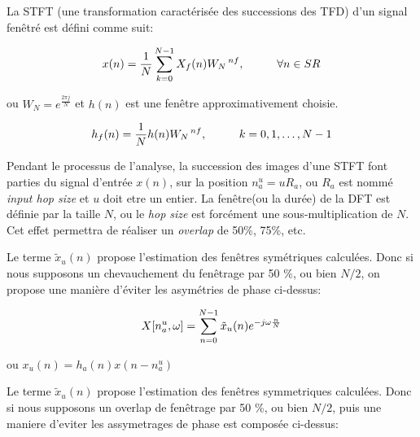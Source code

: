 \vspace{0.4cm}

La STFT (une transformation caractérisée des successions des TFD) d'un signal fenêtré est défini comme suit:

\begin{equation}
    x(n) = \frac{1}{N}\sum_{ k = 0 }^{ N-1 } X_f (n)W_N \hspace{0.05cm}^{ nf}, \hspace{1cm} \forall n \in SR 
\end{equation}

ou \hspace{0.1cm} $ W_N = e ^ {\frac{2\pi j}{N}} $ \hspace{0.1cm} et $ h(n) $ est une fenêtre approximativement choisie.

\begin{equation}
    h_f(n) = \frac{1}{N} h(n) W_N \hspace{0.05cm} ^{nf},\hspace{1cm}  k = 0, 1, \dots, N - 1 
\end{equation}

Pendant le processus de l'analyse, la succession des images d'une STFT font parties du signal d'entrée $x(n)$, sur la position $n_a^u = uR_a$, ou $R_a$ est nommé \textit{input hop size} et $u$ doit etre un entier. La fenêtre(ou la durée) de la DFT est définie par la taille $N$, ou le \textit{hop size} est forcément une sous-multiplication de $N$. Cet effet permettra de réaliser un \textit{overlap} de 50\%, 75\%, etc.

Le terme $\tilde{x}_u(n)$ propose l'estimation des fenêtres symétriques calculées. Donc si nous supposons un chevauchement du fenêtrage par 50 \%, ou bien $N/2$, on propose une manière d'éviter les asymétries de phase ci-dessus:  

\begin{equation}
    X[n_a^u, \omega] = \sum_{n=0} ^{N-1} \tilde{x}_u(n) e^{-j \omega \frac{n}{N}} \vspace{0.5cm} 
\end{equation}

\hspace{5cm} ou \hspace{1cm} ${x}_u(n) = h_a(n) x(n-n_a^u)$ 

Le terme $\tilde{x}_u(n)$ propose l'estimation des fenêtres symmetriques calculées. Donc si nous supposons un overlap de fenêtrage par 50 \%, ou bien $N/2$, puis une maniere d'eviter les assymetrages de phase est composée ci-dessus:  

